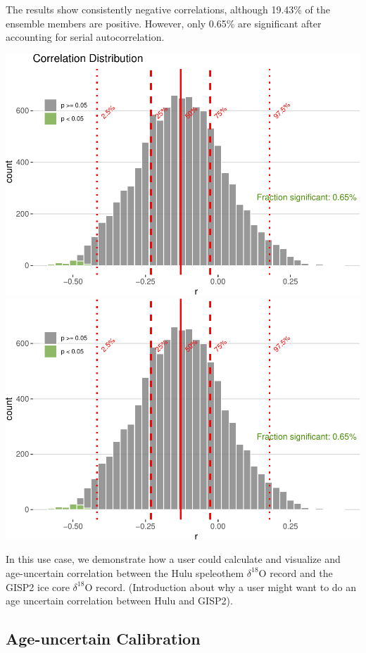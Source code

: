 \documentclass[gc, manuscript]{copernicus}
\begin{document}
The results show consistently negative correlations, although 19.43\% of
the ensemble members are positive. However, only 0.65\% are significant
after accounting for serial autocorrelation.

\includegraphics{geoChronR-paper_files/figure-latex/unnamed-chunk-8-1.pdf}
\includegraphics{geoChronR-paper_files/figure-latex/unnamed-chunk-8-2.pdf}

In this use case, we demonstrate how a user could calculate and
visualize and age-uncertain correlation between the Hulu speleothem
\(\delta^{18}\mathrm{O}\) record and the GISP2 ice core
\(\delta^{18}\mathrm{O}\) record. (Introduction about why a user might
want to do an age uncertain correlation between Hulu and GISP2).

\subsection{Age-uncertain Calibration}
\end{document}
